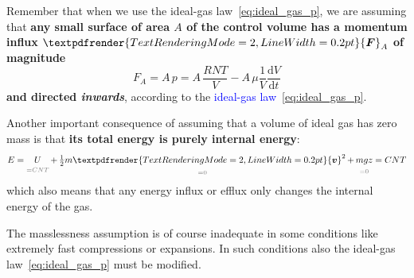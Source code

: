 \documentclass[a4paper,12pt,%
onecolumn,oneside,%
british%
]{memoir}
\renewcommand*{\bm}[1]{\textpdfrender{TextRenderingMode=2,LineWidth=0.2pt}{\boldsymbol{#1}}}
\newcommand*{\di}{\mathrm{d}}%
\renewcommand*{\|}[1][]{\nonscript\:#1\vert\nonscript\:\mathopen{}}
\newcommand*{\sect}{\S}%
\renewcommand*{\autoref}[2]{\sidepar{\vspace{-1ex}\footnotesize{\color{blue}\faIcon{%
angle-right%
}\enspace\sect~\ref{#1} page~\pageref{#1}}}\textcolor{blue}{#2}}
\newcommand*{\yvis}{\mu} %
\newcommand*{\yv}{\bm{v}}
\newcommand*{\yN}{N}
\newcommand*{\yM}{m}%
\newcommand*{\yE}{E}
\newcommand*{\yU}{U}
\newcommand*{\yF}{\bm{F}}
\newcommand*{\ypr}{p} %
\newcommand*{\yT}{T}%
\begin{document}
Remember that when we use the ideal-gas law~\eqref{eq:ideal_gas_p}, we are assuming that \textbf{any small surface of area $A$ of the control volume has a momentum influx $\yF_{A}$ of magnitude}
\begin{equation*}
  F_{A} = A\,\ypr = A\,\frac{R \yN \yT}{V} - A\,\yvis \frac{1}{V}\frac{\di V}{\di t}
\end{equation*}
\textbf{and directed \emph{inwards}}, according to the \autoref{def:idealgas_law}{ideal-gas law}~\eqref{eq:ideal_gas_p}.

\medskip

Another important consequence of assuming that a volume of ideal gas has zero mass is that \textbf{its total energy is purely internal energy}:
\begin{equation*}
  \yE =
 \underbracket[0pt]{\yU}_{\mathcolor{midgrey}{{}=C N \yT}}
  + \underbracket[0pt]{\tfrac12\yM\yv^{2}}_{\mathcolor{midgrey}{{}=0}}
  + \underbracket[0pt]{\yM g z}_{\mathcolor{midgrey}{{}=0}}
  = C N \yT
\end{equation*}
which also means that any energy influx or efflux only changes the internal energy of the gas.

The masslessness assumption is of course inadequate in some conditions like extremely fast compressions or expansions. In such conditions also the ideal-gas law~\eqref{eq:ideal_gas_p} must be modified.

\end{document}
